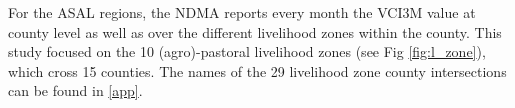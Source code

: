 \documentclass[review]{elsarticle}
\begin{document}
For the ASAL regions, the NDMA reports every month the VCI3M value at county level as well as over the different livelihood zones within the county. This study focused on the 10 (agro)-pastoral livelihood zones (see Fig \ref{fig:l_zone}), which cross 15 counties. The names of the 29 livelihood zone county intersections can be found in \ref{app}. 







\end{document}
